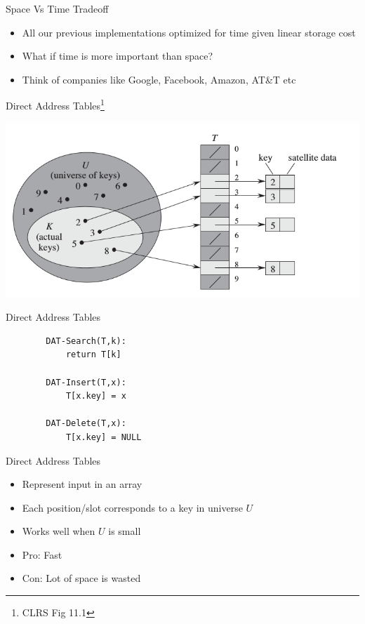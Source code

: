 \documentclass{beamer}
\begin{document}
\begin{frame}{Space Vs Time Tradeoff}
    \begin{itemize}
        \item All our previous implementations optimized for time given linear storage cost
        \item What if time is more important than space?
        \item Think of companies like Google, Facebook, Amazon, AT\&T etc
    \end{itemize}
\end{frame}

\begin{frame}{Direct Address Tables\footnote{CLRS Fig 11.1}}
    \begin{center}
        \includegraphics[scale=0.4]{directAddrssTable.png}
    \end{center}
\end{frame}

\begin{frame}[fragile]{Direct Address Tables}
    \begin{verbatim}
        DAT-Search(T,k):
            return T[k]

        DAT-Insert(T,x):
            T[x.key] = x

        DAT-Delete(T,x):
            T[x.key] = NULL
    \end{verbatim}
\end{frame}

\begin{frame}{Direct Address Tables}
    \begin{itemize}
        \item Represent input in an array 
        \item Each position/slot corresponds to a key in universe $U$
        \item Works well when $U$ is small
        \item Pro: \pause Fast
        \item Con: \pause Lot of space is wasted
    \end{itemize}
\end{frame}
\end{document}
